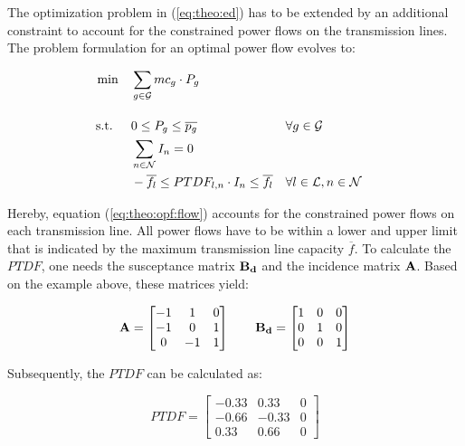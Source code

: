 The optimization problem in (\ref{eq:theo:ed}) has to be extended by an additional constraint to account for the constrained power flows on the transmission lines. The problem formulation for an optimal power flow evolves to:

\begin{subequations}
	\begin{align}
		 \min \quad & \sum_{g\in\mathcal{G}}mc_g \cdot P_{g} \label{eq:theo:opf} \\[10pt]
		 \text{s.t. } \quad & 0 \leq P_{g} \leq \overline{p_g} && \forall g \in \mathcal{G} \\
		 & \sum_{n \in \mathcal{N}} I_n = 0 \label{eq:theo:opf:balance} \\
		 & -\overline{f_l} \leq PTDF_{l,n} \cdot I_n \leq \overline{f_l} && \forall l \in \mathcal{L}, n \in \mathcal{N} \label{eq:theo:opf:flow}
	\end{align}
\end{subequations}

Hereby, equation (\ref{eq:theo:opf:flow}) accounts for the constrained power flows on each transmission line. All power flows have to be within a lower and upper limit that is indicated by the maximum transmission line capacity $\overline{f}$. To calculate the $PTDF$, one needs the susceptance matrix $\vb{B_d}$ and the incidence matrix $\vb{A}$. Based on the example above, these matrices yield:

\begin{equation}
	\vb{A} = \begin{bmatrix}
		-1 & 1 & 0 \\
		-1 & 0 & 1 \\
		0 & -1 & 1
	\end{bmatrix} \quad \quad 
	\vb{B_d} = \begin{bmatrix}
		1 & 0 & 0 \\
		0 & 1 & 0 \\
		0 & 0 & 1
	\end{bmatrix}
\end{equation}


Subsequently, the $PTDF$ can be calculated as:

\begin{equation}
	PTDF = \begin{bmatrix}
		-0.33 & 0.33 & 0 \\
		-0.66 & -0.33 & 0 \\
		0.33 & 0.66 & 0
	\end{bmatrix}
\end{equation}

